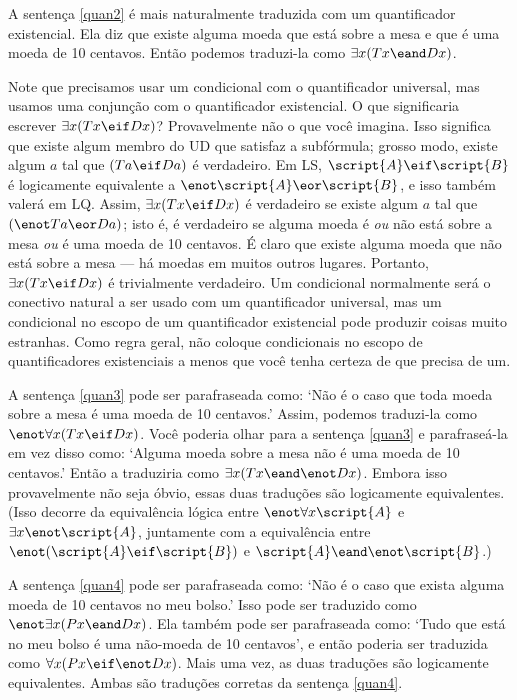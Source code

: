 A sentença \ref{quan2} é mais naturalmente traduzida com um quantificador existencial. Ela diz que existe alguma moeda que está sobre a mesa e que é uma moeda de 10 centavos. Então podemos traduzi-la como $\exists x(Tx \eand Dx)$.

Note que precisamos usar um condicional com o quantificador universal, mas usamos uma conjunção com o quantificador existencial. O que significaria escrever $\exists x(Tx \eif Dx)$? Provavelmente não o que você imagina. Isso significa que existe algum membro do UD que satisfaz a subfórmula; grosso modo, existe algum $a$ tal que $(Ta \eif Da)$ é verdadeiro. Em LS, $\script{A} \eif \script{B}$ é logicamente equivalente a $\enot\script{A} \eor \script{B}$, e isso também valerá em LQ. Assim, $\exists x(Tx \eif Dx)$ é verdadeiro se existe algum $a$ tal que $(\enot Ta \eor Da)$; isto é, é verdadeiro se alguma moeda é \emph{ou} não está sobre a mesa \emph{ou} é uma moeda de 10 centavos. É claro que existe alguma moeda que não está sobre a mesa — há moedas em muitos outros lugares. Portanto, $\exists x(Tx \eif Dx)$ é trivialmente verdadeiro. Um condicional normalmente será o conectivo natural a ser usado com um quantificador universal, mas um condicional no escopo de um quantificador existencial pode produzir coisas muito estranhas. Como regra geral, não coloque condicionais no escopo de quantificadores existenciais a menos que você tenha certeza de que precisa de um.

A sentença \ref{quan3} pode ser parafraseada como: `Não é o caso que toda moeda sobre a mesa é uma moeda de 10 centavos.' Assim, podemos traduzi-la como $\enot \forall x(Tx \eif Dx)$. Você poderia olhar para a sentença \ref{quan3} e parafraseá-la em vez disso como: `Alguma moeda sobre a mesa não é uma moeda de 10 centavos.' Então a traduziria como $\exists x(Tx \eand \enot Dx)$. Embora isso provavelmente não seja óbvio, essas duas traduções são logicamente equivalentes. (Isso decorre da equivalência lógica entre $\enot\forall x\script{A}$ e $\exists x\enot\script{A}$, juntamente com a equivalência entre $\enot(\script{A}\eif\script{B})$ e $\script{A}\eand\enot\script{B}$.)

A sentença \ref{quan4} pode ser parafraseada como: `Não é o caso que exista alguma moeda de 10 centavos no meu bolso.' Isso pode ser traduzido como $\enot\exists x(Px \eand Dx)$. Ela também pode ser parafraseada como: `Tudo que está no meu bolso é uma não-moeda de 10 centavos', e então poderia ser traduzida como $\forall x(Px \eif \enot Dx)$. Mais uma vez, as duas traduções são logicamente equivalentes. Ambas são traduções corretas da sentença \ref{quan4}.


